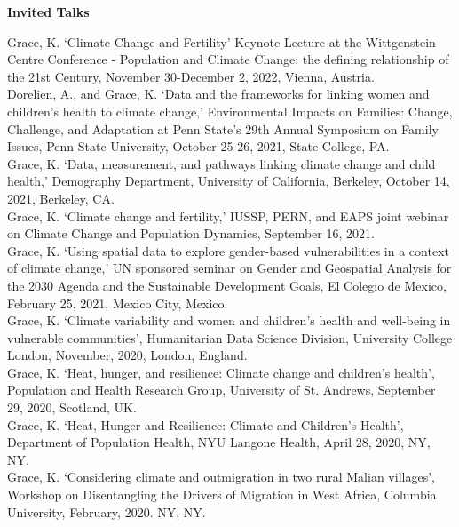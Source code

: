 \documentclass[11pt]{article} %
\begin{document}
\noindent
\textbf {Invited Talks}

\noindent
Grace, K. `Climate Change and Fertility' Keynote Lecture at the Wittgenstein Centre Conference - Population and Climate Change: the defining relationship of the 21st Century, November 30-December 2, 2022, Vienna, Austria.\\


\noindent
Dorelien, A., and Grace, K.  `Data and the frameworks for linking women and children’s health to climate change,' Environmental Impacts on Families: Change, Challenge, and Adaptation at Penn State’s 29th Annual Symposium on Family Issues, Penn State University,  October 25-26, 2021, State College, PA.\\

\noindent
Grace, K. `Data, measurement, and pathways linking climate change and child health,' Demography Department, University of California, Berkeley, October 14, 2021, Berkeley, CA.\\

\noindent
Grace, K. `Climate change and fertility,' IUSSP, PERN, and EAPS joint webinar on Climate Change and Population Dynamics, September 16, 2021.\\

\noindent
Grace, K.  `Using spatial data to explore gender-based vulnerabilities in a context of climate change,'
UN sponsored seminar on Gender and Geospatial Analysis for the 2030 Agenda and the Sustainable Development Goals, El Colegio de Mexico, February 25, 2021, Mexico City, Mexico.\\

\noindent
Grace, K. ‘Climate variability and women and children’s health and well-being in vulnerable communities’, Humanitarian Data Science Division, University College London, November, 2020, London, England.\\

\noindent
Grace, K. `Heat, hunger, and resilience: Climate change and children's health', Population and Health Research Group, University of St. Andrews, September 29, 2020, Scotland, UK.\\

\noindent
Grace, K. `Heat, Hunger and Resilience: Climate and Children's Health', Department of Population Health, NYU Langone Health, April 28, 2020, NY, NY.\\

\noindent
Grace, K. `Considering climate and outmigration in two rural Malian villages', Workshop on Disentangling the Drivers of Migration in West Africa, Columbia University, February, 2020. NY, NY.\\
\end{document}
